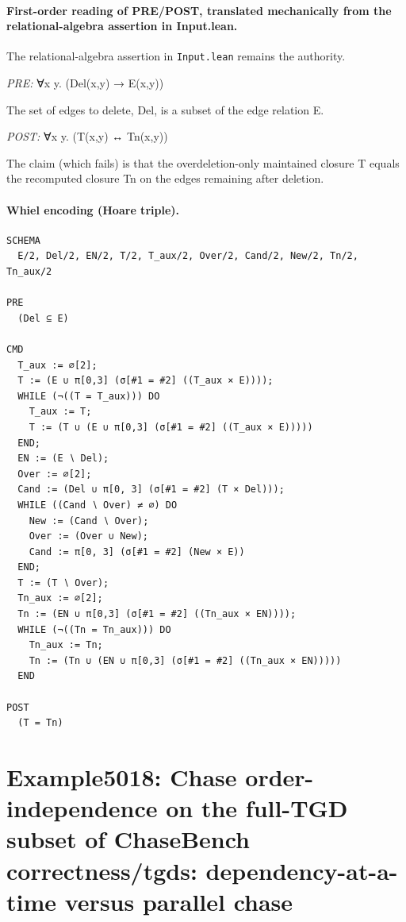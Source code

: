 \documentclass[10pt]{article}
\begin{document}
\paragraph{First-order reading of PRE/POST, translated mechanically from the relational-algebra assertion in Input.lean.} The relational-algebra assertion in \texttt{Input.lean} remains the authority.

\textit{PRE:} ∀x y. (Del(x,y) → E(x,y))\par The set of edges to delete, Del, is a subset of the edge relation E.

\textit{POST:} ∀x y. (T(x,y) ↔ Tn(x,y))\par The claim (which fails) is that the overdeletion-only maintained closure T equals the recomputed closure Tn on the edges remaining after deletion.

\paragraph{Whiel encoding (Hoare triple).}

\begin{Verbatim}[fontsize=\scriptsize,breaklines=true,breakanywhere=true,frame=single,framesep=1.5mm]
SCHEMA
  E/2, Del/2, EN/2, T/2, T_aux/2, Over/2, Cand/2, New/2, Tn/2, Tn_aux/2

PRE
  (Del ⊆ E) 

CMD
  T_aux := ∅[2];
  T := (E ∪ π[0,3] (σ[#1 = #2] ((T_aux × E))));
  WHILE (¬((T = T_aux))) DO
    T_aux := T;
    T := (T ∪ (E ∪ π[0,3] (σ[#1 = #2] ((T_aux × E)))))
  END;
  EN := (E ∖ Del);
  Over := ∅[2];
  Cand := (Del ∪ π[0, 3] (σ[#1 = #2] (T × Del)));
  WHILE ((Cand ∖ Over) ≠ ∅) DO
    New := (Cand ∖ Over);
    Over := (Over ∪ New);
    Cand := π[0, 3] (σ[#1 = #2] (New × E))
  END;
  T := (T ∖ Over);
  Tn_aux := ∅[2];
  Tn := (EN ∪ π[0,3] (σ[#1 = #2] ((Tn_aux × EN))));
  WHILE (¬((Tn = Tn_aux))) DO
    Tn_aux := Tn;
    Tn := (Tn ∪ (EN ∪ π[0,3] (σ[#1 = #2] ((Tn_aux × EN)))))
  END

POST
  (T = Tn)
\end{Verbatim}

\Needspace{0.45\textheight}

\section{Example5018: Chase order-independence on the full-TGD subset of ChaseBench correctness/tgds: dependency-at-a-time versus parallel chase}\label{case:Example5018}
\end{document}
